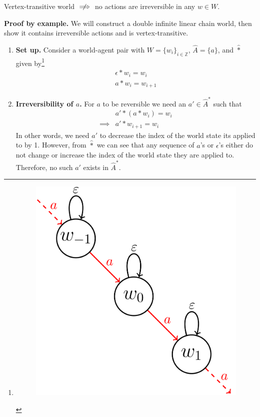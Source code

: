 \begin{propositionE}
    Vertex-transitive world $\centernot\implies$ no actions are irreversible in any $w \in W$.
\end{propositionE}
\begin{proofE}
    \textbf{Proof by example.}
    We will construct a double infinite linear chain world, then show it contains irreversible actions and is vertex-transitive.
\begin{enumerate}
    \item \textbf{Set up.}
    Consider a world-agent pair with $W = \{w_{i}\}_{i \in \mathbb{Z}}$, $\hat{A} = \{a\}$, and $\hat{\ast}$ given by\footnote{\begin{figure}[H]
        \includegraphics[width=0.5\linewidth]{6BeyondSBDRLLocalAlgebras/Images/infinite_double_linear_chain_world.png}
        \caption{
        }
    \end{figure}}
    \begin{align}
        \epsilon \ast w_{i} = w_{i} \\
        a \ast w_{i} = w_{i+1}
    \end{align}

    \item \textbf{Irreversibility of $a$.}
    For $a$ to be reversible we need an $a' \in \hat{A}^{*}$ such that
    \begin{align}
        & a' \ast (a \ast w_{i}) = w_{i} \\
        \implies & a' \ast w_{i + 1} = w_{i}
    \end{align}
    In other words, we need $a'$ to decrease the index of the world state its applied to by 1.
    However, from $\hat{\ast}$ we can see that any sequence of $a$'s or $\epsilon$'s either do not change or increase the index of the world state they are applied to.
    Therefore, no such $a'$ exists in $\hat{A}^{*}$.


\end{enumerate}
\end{proofE}
